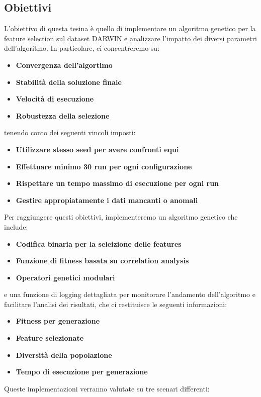 \documentclass[11pt,a4paper]{article}
\begin{document}
\subsection{Obiettivi}
L'obiettivo di questa tesina è quello di implementare un algoritmo genetico per la feature selection sul dataset DARWIN e analizzare l'impatto dei diversi parametri dell'algoritmo. In particolare, ci concentreremo su:
\begin{itemize}
  \item \textbf{Convergenza dell'algortimo}
  \item \textbf{Stabilità della soluzione finale}
  \item \textbf{Velocità di esecuzione}
  \item \textbf{Robustezza della selezione}
\end{itemize}
tenendo conto dei seguenti vincoli imposti: 
\begin{itemize}
  \item \textbf{Utilizzare stesso seed per avere confronti equi}
  \item \textbf{Effettuare minimo 30 run per ogni configurazione}
  \item \textbf{Rispettare un tempo massimo di esecuzione per ogni run}
  \item \textbf{Gestire appropiatamente i dati mancanti o anomali}
\end{itemize}
Per raggiungere questi obiettivi, implementeremo un algoritmo genetico che include:
\begin{itemize}
  \item \textbf{Codifica binaria per la seleizione delle features}
  \item \textbf{Funzione di fitness basata su correlation analysis}
  \item \textbf{Operatori genetici modulari}
\end{itemize}
e una funzione di logging dettagliata per monitorare l'andamento dell'algoritmo e facilitare l'analisi dei risultati, che ci restituisce le seguenti informazioni:
\begin{itemize}
  \item \textbf{Fitness per generazione}
  \item \textbf{Feature selezionate}
  \item \textbf{Diversità della popolazione}
  \item \textbf{Tempo di esecuzione per generazione}
\end{itemize}
Queste implementazioni verranno valutate su tre scenari differenti:
\end{document}
